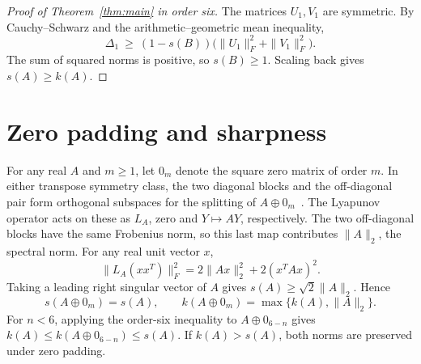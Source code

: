\documentclass[11pt,letterpaper]{article}
\begin{document}
\begin{proof}[Proof of Theorem~\ref{thm:main} in order six]
The matrices \(U_1,V_1\) are symmetric. By Cauchy--Schwarz and the
arithmetic--geometric mean inequality,
\[
\Delta_1\ \ge\
(1-s(B))\bigl(\|U_1\|_F^2+\|V_1\|_F^2\bigr).
\]
The sum of squared norms is positive, so \(s(B)\ge1\).
Scaling back gives \(s(A)\ge k(A)\).
\end{proof}

\section{Zero padding and sharpness}\label{sec:sharpness}

For any real \(A\) and \(m\ge1\), let \(0_m\) denote the square
zero matrix of order \(m\). In either transpose symmetry class, the
two diagonal blocks and the off-diagonal pair form orthogonal
subspaces for the splitting of \(A\oplus0_m\)~\cite{kressner-vandereycken}.
The Lyapunov
operator acts on these as \(L_A\), zero and \(Y\mapsto AY\),
respectively. The two off-diagonal blocks have the same Frobenius
norm, so this last map contributes \(\|A\|_2\), the spectral norm.
For any real unit vector \(x\),
\[
\|L_A(xx^T)\|_F^2=2\|Ax\|_2^2+2(x^TAx)^2 .
\]
Taking a leading right singular vector of \(A\) gives
\(s(A)\ge\sqrt{2}\|A\|_2\). Hence
\begin{equation}\label{eq:padding}
s(A\oplus0_m)=s(A),\qquad
k(A\oplus0_m)=\max\{k(A),\|A\|_2\}.
\end{equation}
For \(n<6\), applying the order-six inequality to \(A\oplus0_{6-n}\)
gives \(k(A)\le k(A\oplus0_{6-n})\le s(A)\).
If \(k(A)>s(A)\), both norms are preserved
under zero padding.
\end{document}
